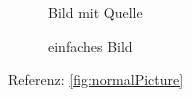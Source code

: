 \begin{figure}[h!]
	\centering
	\vspace{10pt}
	\caption[Bild mit Quelle]{Bild mit Quelle \protect{}}\label{fig:withSource}
\end{figure}

\begin{figure}[h!]
	\centering
	\vspace{10pt}
	\caption{einfaches Bild}\label{fig:normalPicture}
\end{figure}


Referenz:   \autoref{fig:normalPicture}